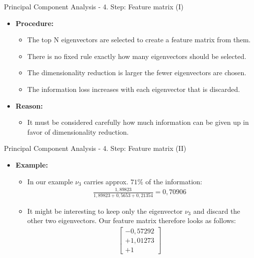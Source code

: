 \begin{frame}{Principal Component Analysis - 4. Step: Feature matrix (I)}
	\begin{itemize}
		\item \textbf{Procedure:}
		      \begin{itemize}
			      \item The top N eigenvectors are selected to create a feature
			            matrix from them.
			      \item There is no fixed rule exactly how many eigenvectors should
			            be selected.
			      \item The dimensionality reduction is larger the
			            fewer eigenvectors are chosen.
			      \item The information loss increases with each eigenvector that is
			            discarded.
		      \end{itemize}
		\item \textbf{Reason:}
		      \begin{itemize}
			      \item It must be considered carefully how much information can be
			            given up in favor of dimensionality reduction.
		      \end{itemize}
	\end{itemize}
\end{frame}

\begin{frame}{Principal Component Analysis - 4. Step: Feature matrix (II)}
	\begin{itemize}
		\item \textbf{Example:}
		      \begin{itemize}
			      \item In our example $\nu_3$ carries approx. $71\%$ of the
			            information: \\
			            \begin{align}
				            \frac{1,89823}{1,89823+0,5653+0,21354} = 0,70906
			            \end{align}
			      \item It might be interesting to keep only the eigenvector $\nu_3$
			            and discard the other two eigenvectors. Our feature matrix
			            therefore looks as follows:
			            \begin{align}
				            \begin{bmatrix} -0,57292 \\ +1,01273 \\ +1\end{bmatrix}
			            \end{align}
		      \end{itemize}
	\end{itemize}
\end{frame}

